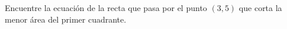 \item Encuentre la ecuación de la recta que pasa por el punto $(3, 5)$ que corta la menor área del primer cuadrante.
